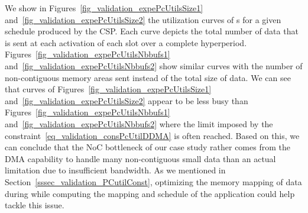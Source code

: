 \documentclass[main.tex]{subfiles}
\begin{document}
We show in Figures~\ref{fig_validation_expePcUtilsSize1} and~\ref{fig_validation_expePcUtilsSize2} the utilization curves of \PC{}s for a given schedule produced by the CSP. Each curve depicts the total number of data that is sent at each activation of each \PC{} slot over a complete hyperperiod. Figures~\ref{fig_validation_expePcUtilsNbbufs1} and~\ref{fig_validation_expePcUtilsNbbufs2} show similar curves with the number of non-contiguous memory areas sent instead of the total size of data. We can see that curves of Figures~\ref{fig_validation_expePcUtilsSize1} and~\ref{fig_validation_expePcUtilsSize2} appear to be less busy than Figures~\ref{fig_validation_expePcUtilsNbbufs1} and~\ref{fig_validation_expePcUtilsNbbufs2} where the limit imposed by the constraint~\ref{eq_validation_consPcUtilDDMA} is often reached. Based on this, we can conclude that the NoC bottleneck of our case study rather comes from the DMA capability to handle many non-contiguous small data than an actual limitation due to insufficient bandwidth. As we mentioned in Section~\ref{sssec_validation_PCutilConst}, optimizing the memory mapping of data during while computing the mapping and schedule of the application could help tackle this issue.
\end{document}
